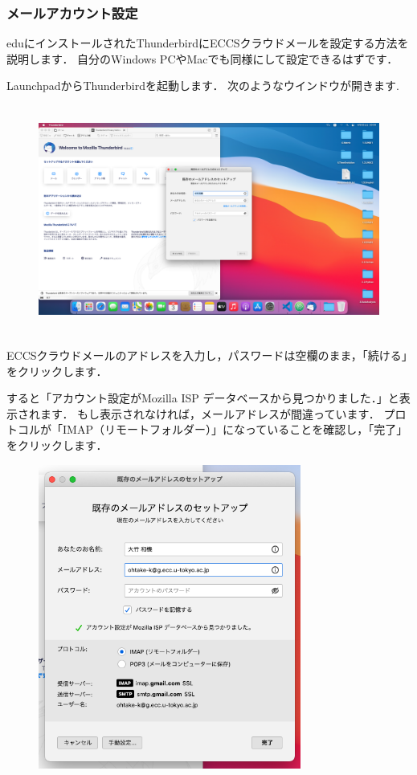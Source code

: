 \documentclass{jarticle}
\begin{document}

\subsubsection{メールアカウント設定}
eduにインストールされたThunderbirdにECCSクラウドメールを設定する方法を説明します．
自分のWindows PCやMacでも同様にして設定できるはずです．

LaunchpadからThunderbirdを起動します．
次のようなウインドウが開きます.\
\begin{figure}[H]
  \centering
  \includegraphics[height=7.5cm]{fig/MacThunderbird1.png}
\end{figure}
ECCSクラウドメールのアドレスを入力し，パスワードは空欄のまま，「続ける」をクリックします．

\newpage
すると「アカウント設定がMozilla ISP データベースから見つかりました．」と表示されます．
もし表示されなければ，メールアドレスが間違っています．
プロトコルが「IMAP（リモートフォルダー）」になっていることを確認し，「完了」をクリックします．
\begin{figure}[H]
  \centering
  \includegraphics[height=10cm]{fig/MacThunderbird2trim.png}
\end{figure}
\end{document}
